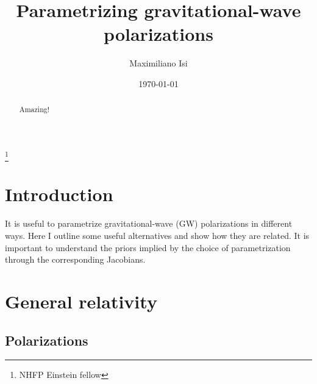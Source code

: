 \documentclass[aps,prd,twocolumn,superscriptaddress,preprintnumbers,floatfix,nofootinbib]{revtex4-2}
\newcommand{\dcc}{LIGO-PXXXXXXX}
\begin{document}

\title{Parametrizing gravitational-wave polarizations}

\author{Maximiliano Isi}
\thanks{NHFP Einstein fellow}
%


\date{\today}

\begin{abstract}
Amazing!
\end{abstract}

\maketitle


\section{Introduction}
\label{sec:intro}

It is useful to parametrize gravitational-wave (GW) polarizations in different ways.
Here I outline some useful alternatives and show how they are related.
It is important to understand the priors implied by the choice of parametrization through the corresponding Jacobians.

\section{General relativity}

\subsection{Polarizations}
\end{document}
